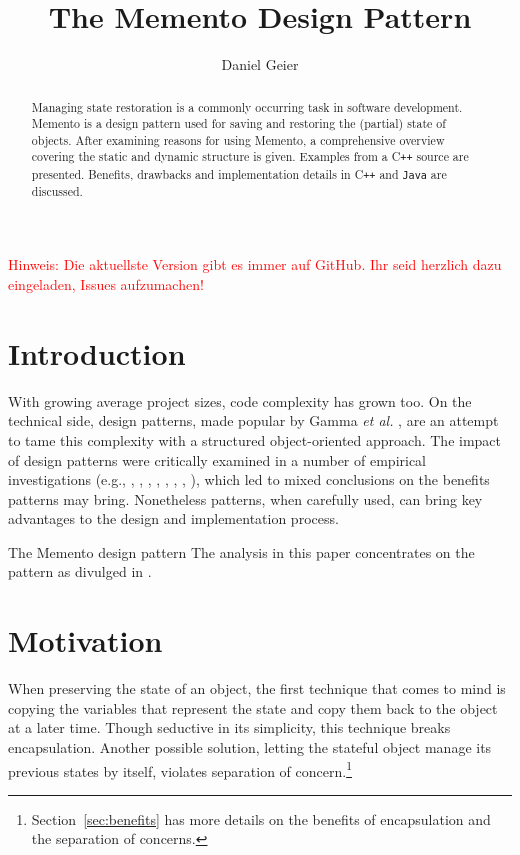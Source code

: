 \documentclass[11pt, a4paper, twoside]{article}
\title{The Memento Design Pattern}
\author{Daniel Geier}
\date{} %
\def\cpp{C{}\texttt{++}}
\begin{document}
	\maketitle
	
	\begin{framed}
		\noindent\textcolor{red}{Hinweis: Die aktuellste Version gibt es immer auf GitHub. Ihr seid herzlich dazu eingeladen, Issues aufzumachen!\footnotemark}
	\end{framed}

	\begin{abstract} \noindent
 		Managing state restoration is a commonly occurring task in software development. Memento is a design pattern used for saving and restoring the (partial) state of objects. After examining reasons for using Memento, a comprehensive overview covering the static and dynamic structure is given. Examples from a \cpp{} source are presented. Benefits, drawbacks and implementation details in \cpp{} and \verb|Java| are discussed.
	\end{abstract}
	
	\section{Introduction}
	\label{sec:intro}
	With growing average project sizes, code complexity has grown too. On the technical side, design patterns, made popular by Gamma \textit{et al.} \cite{gamma1993design}, are an attempt to tame this complexity with a structured object-oriented approach. The impact of design patterns were critically examined in a number of empirical investigations (e.g., \cite{bieman2003design}, \cite{porras2010empirical}, \cite{jeanmart2009impact}, \cite{khomh2008design}, \cite{di2008empirical}, \cite{prechelt2001controlled}, \cite{vokac2004defect}, \cite{vokavc2004controlled}), which led to mixed conclusions on the benefits patterns may bring. Nonetheless patterns, when carefully used, can bring key advantages to the design and implementation process.
	
	The Memento design pattern The analysis in this paper concentrates on the pattern as divulged in \cite{gamma1994design}.
	
	\section{Motivation}
	\label{sec:motivation}
	 When preserving the state of an object, the first technique that comes to mind is copying the variables that represent the state and copy them back to the object at a later time. Though seductive in its simplicity, this technique breaks encapsulation. Another possible solution, letting the stateful object manage its previous states by itself, violates separation of concern.\footnote{Section~\ref{sec:benefits} has more details on the benefits of encapsulation and the separation of concerns.}
	 
\end{document}

